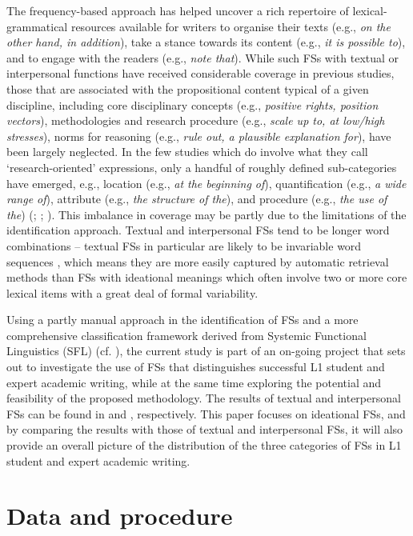 \documentclass[output=paper]{langsci/langscibook}
\begin{document}
The frequency-based approach has helped uncover a rich repertoire of lexical-grammatical resources available for writers to organise their texts (e.g., \textit{on the other hand, in addition}), take a stance towards its content (e.g., \textit{it is possible to}), and to engage with the readers (e.g., \textit{note that}). While such FSs with textual or interpersonal functions have received considerable coverage in previous studies, those that are associated with the propositional content typical of a given discipline, including core disciplinary concepts (e.g., \textit{positive rights, position vectors}), methodologies and research procedure (e.g., \textit{scale up to, at low/high stresses}), norms for reasoning (e.g., \textit{rule out, a plausible explanation for}), have been largely neglected. In the few studies which do involve what they call ‘research-oriented’ expressions, only a handful of roughly defined sub-categories have emerged, e.g., location (e.g., \textit{at the beginning of}), quantification (e.g., \textit{a wide range of}), attribute (e.g., \textit{the structure of the}), and procedure (e.g., \textit{the use of the}) (\citealt{Cortes2004}; \citealt{BiberEtAl2004}; \citealt{Hyland2008}). This imbalance in coverage may be partly due to the limitations of the identification approach. Textual and interpersonal FSs tend to be longer word combinations – textual FSs in particular are likely to be invariable word sequences \citep{Wang2019}, which means they are more easily captured by automatic retrieval methods than FSs with ideational meanings which often involve two or more core lexical items with a great deal of formal variability. 

Using a partly manual approach in the identification of FSs and a more comprehensive classification framework derived from Systemic Functional Linguistics (SFL) (cf. ), the current study is part of an on-going project that sets out to investigate the use of FSs that distinguishes successful L1 student and expert academic writing, while at the same time exploring the potential and feasibility of the proposed methodology. The results of textual and interpersonal FSs can be found in \citet{Wang2018} and \citet{Wang2019}, respectively. This paper focuses on ideational FSs, and by comparing the results with those of textual and interpersonal FSs, it will also provide an overall picture of the distribution of the three categories of FSs in L1 student and expert academic writing.

\section{Data and procedure}
\end{document}
